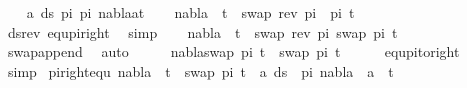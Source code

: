\begin{isabellebody}
%
\isadelimproof
%
\endisadelimproof
%
\isatagproof
{}\isamarkupfalse%
{\isacharminus}{\kern0pt}\isanewline
\ \ \isamarkupfalse%
\ {\isachardoublequoteopen}{\isacharparenleft}{\kern0pt}{\isasymforall}a{\isasymin}\ ds\ pi{}\ pi{}{\isachardot}{\kern0pt}\ nabla{\isasymturnstile}a{\isasymsharp}t{\isacharparenright}{\kern0pt}{\isachardoublequoteclose}\isanewline
\ \ \isamarkupfalse%
\ {\isachardoublequoteopen}nabla\ {\isasymturnstile}\ t\ {\isasymapprox}\ swap\ {\isacharparenleft}{\kern0pt}rev\ pi{}\ {\isacharat}{\kern0pt}\ pi{}{\isacharparenright}{\kern0pt}\ t{\isachardoublequoteclose}\ \isanewline
\ \ \ \ \isamarkupfalse%
\ ds{\isacharunderscore}{\kern0pt}rev\ equ{\isacharunderscore}{\kern0pt}pi{\isacharunderscore}{\kern0pt}right\ \isamarkupfalse%
\ simp\isanewline
\ \ \isamarkupfalse%
\ {\isachardoublequoteopen}nabla\ {\isasymturnstile}\ t\ {\isasymapprox}\ swap\ {\isacharparenleft}{\kern0pt}rev\ pi{}{\isacharparenright}{\kern0pt}\ {\isacharparenleft}{\kern0pt}swap\ pi{}\ t{\isacharparenright}{\kern0pt}{\isachardoublequoteclose}\isanewline
\ \ \ \ \isamarkupfalse%
\ swap{\isacharunderscore}{\kern0pt}append\ \isamarkupfalse%
\ auto\isanewline
\ \ \isamarkupfalse%
\ \isamarkupfalse%
\ {\isachardoublequoteopen}nabla{\isasymturnstile}swap\ pi{}\ t\ {\isasymapprox}\ swap\ pi{}\ t{\isachardoublequoteclose}\isanewline
\ \ \ \ \isamarkupfalse%
\ equ{\isacharunderscore}{\kern0pt}pi{\isacharunderscore}{\kern0pt}to{\isacharunderscore}{\kern0pt}right\ \isamarkupfalse%
\ simp\isanewline
{}\isamarkupfalse%
%
\endisatagproof
{\isafoldproof}%
%
\isadelimproof
\isanewline
%
\endisadelimproof
\isanewline
\isanewline
\isanewline
{}\isamarkupfalse%
\ pi{\isacharunderscore}{\kern0pt}right{\isacharunderscore}{\kern0pt}equ{\isacharcolon}{\kern0pt}\ {\isachardoublequoteopen}{\isacharparenleft}{\kern0pt}nabla\ {\isasymturnstile}\ t\ {\isasymapprox}\ swap\ pi\ t{\isacharparenright}{\kern0pt}\ {\isasymLongrightarrow}\ {\isacharparenleft}{\kern0pt}{\isasymforall}a{\isasymin}\ ds\ {\isacharbrackleft}{\kern0pt}{\isacharbrackright}{\kern0pt}\ pi{\isachardot}{\kern0pt}\ nabla\ {\isasymturnstile}\ a\ {\isasymsharp}\ t{\isacharparenright}{\kern0pt}{\isachardoublequoteclose}\isanewline
%
\isadelimproof
\ \ %
\endisadelimproof
%
\isatagproof
{}\isamarkupfalse%

\end{isabellebody}
